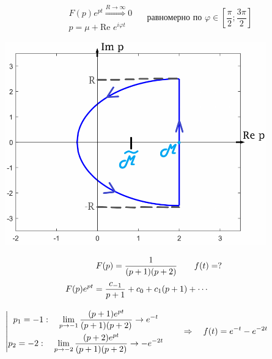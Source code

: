 	\begin{minipage}{0.6\textwidth}	
		$$
			\begin{gathered}
				F(p)e^{pt} \stackrel{R \rightarrow \infty}{\Rightarrow} 0 \\
				p = \mu + \textrm{Re } e^{i\varphi t}
			\end{gathered} \quad \text{ равномерно по } \varphi \in \left[\frac{\pi}{2}; \frac{3\pi}{2}\right]
		$$
	\end{minipage}
	\hfill
	\begin{minipage}{0.4\textwidth}	
		\includegraphics[width=0.85\textwidth]{ch10/pict/analit_pict.png}
	\end{minipage} \newline
	\noindent
	\begin{example}
	$$		
			F(p) = \dfrac{1}{(p+1)(p+2)} \qquad f(t) = ? \vspace{2mm}
	$$
	$
		\begin{gathered}
			F(p)e^{pt} = \dfrac{c_{-1}}{p+1} +c_0 + c_1(p+1) + \cdots  \vspace{3mm} \\
			\left| \begin{gathered}
						p_1 = -1: \quad \lim_{p\to-1}\dfrac{(p+1)e^{pt}}{(p+1)(p+2)} \rightarrow e^{-t} \\
						p_2 = -2: \quad \lim_{p\to-2}\dfrac{(p+2)e^{pt}}{(p+1)(p+2)} \rightarrow -e^{-2t}
					\end{gathered} \right. \qquad \Rightarrow \quad
						f(t) = e^{-t} -  e^{-2t} \vspace{2mm}\\			
		\end{gathered}  
	$\newline
	\end{example}
